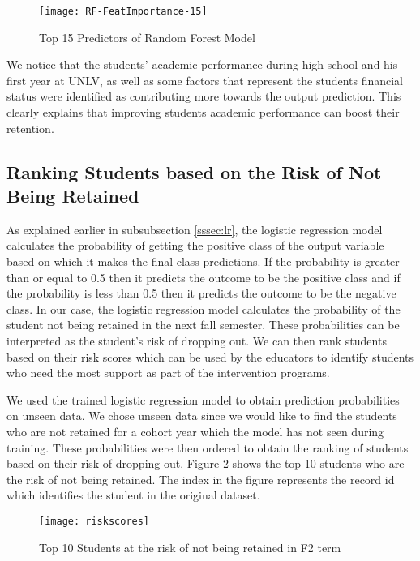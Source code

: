 \documentclass[11pt,openright]{report}
\begin{document}
 \begin{figure}
	\centering
	\texttt{[image: RF-FeatImportance-15]}
	\caption{Top 15 Predictors of Random Forest Model}
	\label{fig:rf_predictors}
\end{figure} 

We notice that the students' academic performance during high school and his first year at UNLV, as well as some factors that represent the students financial status were identified as contributing more towards the output prediction. This clearly explains that improving students academic performance can boost their retention.


\subsection{Ranking Students based on the Risk of Not Being Retained}
As explained earlier in subsubsection \ref{sssec:lr}, the logistic regression model calculates the probability of getting the positive class of the output variable based on which it makes the final class predictions. If the probability is greater than or equal to 0.5 then it predicts the outcome to be the positive class and if the probability is less than 0.5 then it predicts the outcome to be the negative class. In our case, the logistic regression model calculates the probability of the student not being retained in the next fall semester. These probabilities can be interpreted as the student's risk of dropping out. We can then rank students based on their risk scores which can be used by the educators to identify students who need the most support as part of the intervention programs. 

We used the trained logistic regression model to obtain prediction probabilities on unseen data. We chose unseen data since we would like to find the students who are not retained for a cohort year which the model has not seen during training. These probabilities were then ordered to obtain the ranking of students based on their risk of dropping out. Figure \ref{fig:risk_rank} shows the top 10 students who are the risk of not being retained. The index in the figure represents the record id which identifies the student in the original dataset.

 \begin{figure}[!htb]
	\centering
	\texttt{[image: riskscores]}
	\caption{Top 10 Students at the risk of not being retained in F2 term}
	\label{fig:risk_rank}
\end{figure} 
\end{document}
